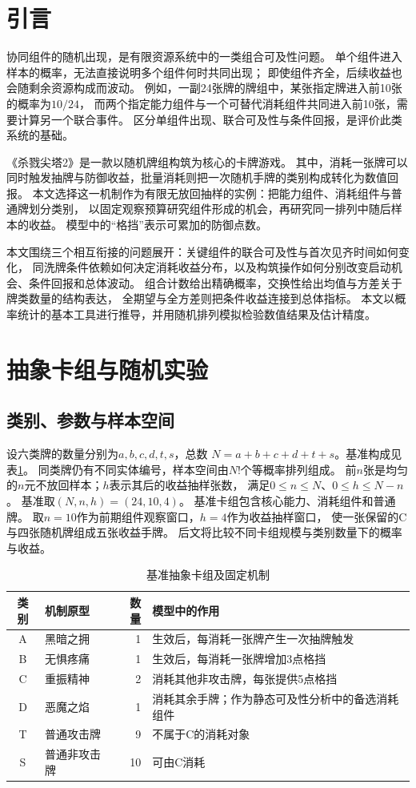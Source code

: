 \section{引言}
协同组件的随机出现，是有限资源系统中的一类组合可及性问题。
单个组件进入样本的概率，无法直接说明多个组件何时共同出现；
即使组件齐全，后续收益也会随剩余资源构成而波动。
例如，一副24张牌的牌组中，某张指定牌进入前10张的概率为$10/24$，
而两个指定能力组件与一个可替代消耗组件共同进入前10张，需要计算另一个联合事件。
区分单组件出现、联合可及性与条件回报，是评价此类系统的基础。

《杀戮尖塔2》是一款以随机牌组构筑为核心的卡牌游戏\cite{steam}。
其中，消耗一张牌可以同时触发抽牌与防御收益，批量消耗则把一次随机手牌的类别构成转化为数值回报。
本文选择这一机制作为有限无放回抽样的实例：把能力组件、消耗组件与普通牌划分类别，
以固定观察预算研究组件形成的机会，再研究同一排列中随后样本的收益。
模型中的“格挡”表示可累加的防御点数。

本文围绕三个相互衔接的问题展开：关键组件的联合可及性与首次见齐时间如何变化，
同洗牌条件依赖如何决定消耗收益分布，以及构筑操作如何分别改变启动机会、条件回报和总体波动。
组合计数给出精确概率，交换性给出均值与方差关于牌类数量的结构表达，
全期望与全方差则把条件收益连接到总体指标。
本文以概率统计的基本工具\cite{blitzstein}进行推导，并用随机排列模拟检验数值结果及估计精度。

\clearpage
\section{抽象卡组与随机实验}\label{sec:model}
\subsection{类别、参数与样本空间}
设六类牌的数量分别为$a,b,c,d,t,s$，总数
$N=a+b+c+d+t+s$。基准构成见表\ref{tab:deck}。
同类牌仍有不同实体编号，样本空间由$N!$个等概率排列组成。
前$n$张是均匀的$n$元不放回样本；$h$表示其后的收益抽样张数，
满足$0\le n\le N$、$0\le h\le N-n$。
基准取$(N,n,h)=(24,10,4)$。
基准卡组包含核心能力、消耗组件和普通牌。
取$n=10$作为前期组件观察窗口，$h=4$作为收益抽样窗口，
使一张保留的C与四张随机牌组成五张收益手牌。
后文将比较不同卡组规模与类别数量下的概率与收益。

\begin{table}[htbp]
\centering\small
\caption{基准抽象卡组及固定机制}\label{tab:deck}
\begin{tabular}{clrp{9.3cm}}
\toprule
类别 & 机制原型 & 数量 & 模型中的作用\\
\midrule
A & 黑暗之拥 & 1 & 生效后，每消耗一张牌产生一次抽牌触发\\
B & 无惧疼痛 & 1 & 生效后，每消耗一张牌增加3点格挡\\
C & 重振精神 & 2 & 消耗其他非攻击牌，每张提供5点格挡\\
D & 恶魔之焰 & 1 & 消耗其余手牌；作为静态可及性分析中的备选消耗组件\\
T & 普通攻击牌 & 9 & 不属于C的消耗对象\\
S & 普通非攻击牌 & 10 & 可由C消耗\\
\bottomrule
\end{tabular}
\end{table}

